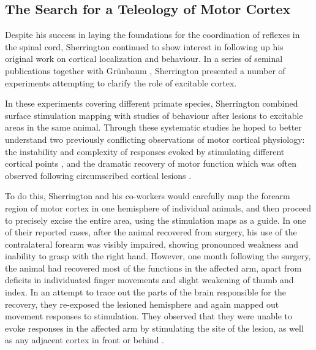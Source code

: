 \subsection{The Search for a Teleology of Motor Cortex}

Despite his success in laying the foundations for the coordination of reflexes in the spinal cord, Sherrington continued to show interest in following up his original work on cortical localization and behaviour. In a series of seminal publications together with Gr\"unbaum \cite{Grunbaum1903,Leyton1917}, Sherrington presented a number of experiments attempting to clarify the role of excitable cortex.

In these experiments covering different primate species, Sherrington combined surface stimulation mapping with studies of behaviour after lesions to excitable areas in the same animal. Through these systematic studies he hoped to better understand two previously conflicting observations of motor cortical physiology: the instability and complexity of responses evoked by stimulating different cortical points \cite{GrahamBrown1912}, and the dramatic recovery of motor function which was often observed following circumscribed cortical lesions \cite{GrahamBrown1913}.

To do this, Sherrington and his co-workers would carefully map the forearm region of motor cortex in one hemisphere of individual animals, and then proceed to precisely excise the entire area, using the stimulation maps as a guide. In one of their reported cases, after the animal recovered from surgery, his use of the contralateral forearm was visibly impaired, showing pronounced weakness and inability to grasp with the right hand. However, one month following the surgery, the animal had recovered most of the functions in the affected arm, apart from deficits in individuated finger movements and slight weakening of thumb and index. In an attempt to trace out the parts of the brain responsible for the recovery, they re-exposed the lesioned hemisphere and again mapped out movement responses to stimulation. They observed that they were unable to evoke responses in the affected arm by stimulating the site of the lesion, as well as any adjacent cortex in front or behind \cite{Leyton1917}.